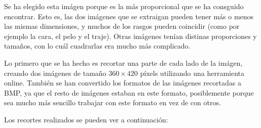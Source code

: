 \documentclass[11pt,a4paper]{article}
\begin{document}
Se ha elegido esta imágen porque es la más proporcional que se ha consguido encontrar. Esto es, las dos imágenes que se extraigan
pueden tener más o menos las mismas dimensiones, y muchos de los rasgos pueden coincidir (como por ejemplo la cara, el pelo y el
traje). Otras imágenes tenían distinas proporciones y tamaños, con lo cuál cuadrarlas era mucho más complicado.

Lo primero que se ha hecho es recortar una parte de cada lado de la imágen, creando dos imágenes de tamaño $360 \times 420$ píxels
utilizando una herramienta online. También se han convertido los formatos de las imágenes recortadas a BMP, ya que el resto de
imágenes estaban en este formato, posiblemente porque sea mucho más sencillo trabajar con este formato en vez de con otros.

Los recortes realizados se pueden ver a continuación:
\end{document}
